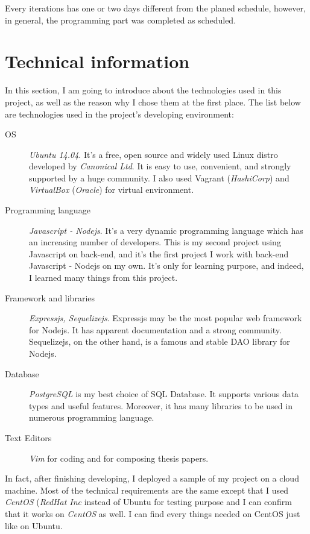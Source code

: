 Every iterations has one or two days different from the planed schedule, however, in general, the programming part was completed as scheduled.


\section{Technical information}

In this section, I am going to introduce about the technologies used in this project, as well as the reason why I chose them at the first place.
The list below are technologies used in the project's developing environment:

\begin{description}
\item[OS] \emph{Ubuntu 14.04}.
It's a free, open source and widely used Linux distro developed by \emph{Canonical Ltd}.
It is easy to use, convenient, and strongly supported by a huge community.
I also used {Vagrant} (\emph{HashiCorp}) and \emph{VirtualBox} (\emph{Oracle}) for virtual environment.
\item[Programming language] \emph{Javascript - Nodejs}.
It's a very dynamic programming language which has an increasing number of developers.
This is my second project using Javascript on back-end, and it's the first project I work with back-end Javascript - Nodejs on my own. It's only for learning purpose, and indeed, I learned many things from this project.
\item[Framework and libraries] \emph{Expressjs, Sequelizejs}.
Expressjs may be the most popular web framework for Nodejs.
It has apparent documentation and a strong community.
Sequelizejs, on the other hand, is a famous and stable DAO library for Nodejs.
\item[Database] \emph{PostgreSQL} is my best choice of SQL Database.
It supports various data types and useful features.
Moreover, it has many libraries to be used in numerous programming language.
\item[Text Editors] \emph{Vim} for coding and \latex for composing thesis papers.
\end{description}

In fact, after finishing developing, I deployed a sample of my project on a cloud machine.
Most of the technical requirements are the same except that I used \emph{CentOS} (\emph{RedHat Inc} instead of Ubuntu for testing purpose and I can confirm that it works on \emph{CentOS} as well.
I can find every things needed on CentOS just like on Ubuntu.

